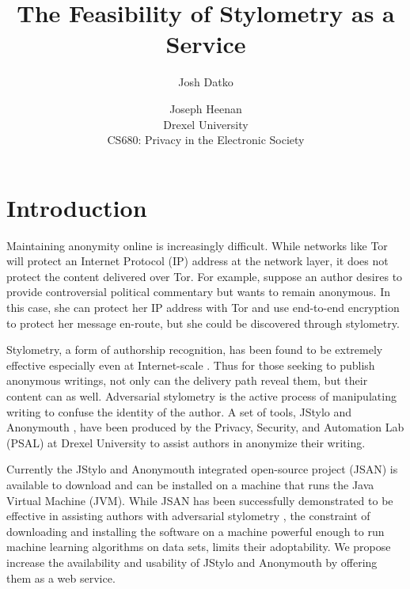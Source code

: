 \documentclass[letterpaper]{article}
\begin{document}
\setcounter{secnumdepth}{1}
\title{The Feasibility of Stylometry as a Service}
\author{Josh Datko \and Joseph Heenan\\ Drexel University\\
CS680: Privacy in the Electronic Society\\
}
\maketitle

\section*{Introduction}\label{sec:intro}


Maintaining anonymity online is increasingly difficult.  While
networks like Tor \cite{Dingledine04tor:the} will protect an Internet
Protocol (IP) address at the network layer, it does not protect the
content delivered over Tor.  For example, suppose an author desires to
provide controversial political commentary but wants to remain
anonymous.  In this case, she can protect her IP address with Tor and
use end-to-end encryption to protect her message en-route, but she
could be discovered through stylometry.

Stylometry, a form of authorship recognition, has been found to be
extremely effective especially even at
Internet-scale \cite{Narayanan:2012:FIA:2310656.2310687}.  Thus for
those seeking to publish anonymous writings, not only can the delivery
path reveal them, but their content can as well.  Adversarial
stylometry is the active process of manipulating writing to confuse
the identity of the author.  A set of tools, JStylo and
Anonymouth \cite{conf/pet/McDonaldACSG12}, have been produced by the
Privacy, Security, and Automation Lab (PSAL) at Drexel University to
assist authors in anonymize their writing.

Currently the JStylo and Anonymouth integrated open-source project
(JSAN) is available to download and can be installed on a machine that
runs the Java Virtual Machine (JVM).  While JSAN has been successfully
demonstrated to be effective in assisting authors with adversarial
stylometry \cite{journals/tissec/BrennanAG12}, the constraint of
downloading and installing the software on a machine powerful enough
to run machine learning algorithms on data sets, limits their
adoptability.  We propose increase the availability and usability of
JStylo and Anonymouth by offering them as a web service.
\end{document}
